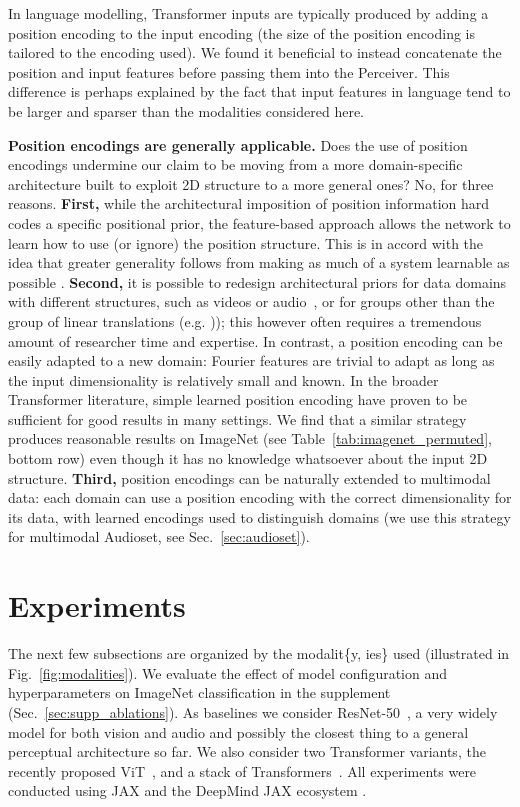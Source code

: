 In language modelling, Transformer inputs are typically produced by adding a position encoding to the input encoding (the size of the position encoding is tailored to the encoding used). We found it beneficial to instead concatenate the position and input features before passing them into the Perceiver. This difference is perhaps explained by the fact that input features in language tend to be larger and sparser than the modalities considered here.

 \textbf{Position encodings are generally applicable.} Does the use of position encodings undermine our claim to be moving from a more domain-specific architecture built to exploit 2D structure to a more general ones? No, for three reasons. \textbf{First,} while the architectural imposition of position information hard codes a specific positional prior, the feature-based approach allows the network to learn how to use (or ignore) the position structure. This is in accord with the idea that greater generality follows from making as much of a system learnable as possible \cite{sutton2019bitter}. \textbf{Second,} it is possible to redesign architectural priors for data domains with different structures, such as videos \cite{tran2015learning} or audio~\cite{ford2019deep}, or for groups other than the group of linear translations (e.g. \citealt{cohen2016group, bronstein2017geometric, esteves2018learning})); this however often requires a tremendous amount of researcher time and expertise. In contrast, a position encoding can be easily adapted to a new domain: Fourier features are trivial to adapt as long as the input dimensionality is relatively small and known. In the broader Transformer literature, simple learned position encoding have proven to be sufficient for good results in many settings. We find that a similar strategy produces reasonable results on ImageNet (see Table~\ref{tab:imagenet_permuted}, bottom row) even though it has no knowledge whatsoever about the input 2D structure. \textbf{Third,} position encodings can be naturally extended to multimodal data: each domain can use a position encoding with the correct dimensionality for its data, with learned encodings used to distinguish domains (we use this strategy for multimodal Audioset, see Sec.~\ref{sec:audioset}).

\section{Experiments}

The next few subsections are organized by the modalit\{y, ies\} used (illustrated in Fig.~\ref{fig:modalities}). We evaluate the effect of model configuration and hyperparameters on ImageNet classification in the supplement (Sec.~\ref{sec:supp_ablations}). As baselines we consider ResNet-50~\cite{he2016deep}, a very widely model for both vision and audio and possibly the closest thing to a general perceptual architecture so far. We also consider two Transformer variants, the recently proposed ViT~\cite{dosovitskiy2020image}, and a stack of Transformers~\cite{vaswani2017attention}. All experiments were conducted using JAX \cite{jax2018github} and the DeepMind JAX ecosystem \cite{deepmind2020jax}.

